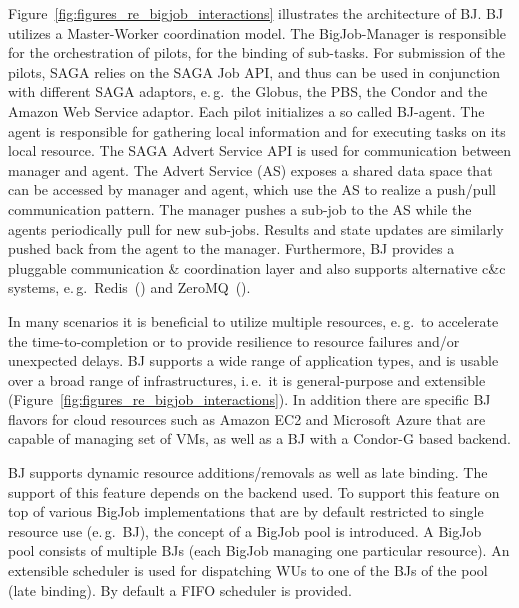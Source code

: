 \documentclass{sig-alternate}
\begin{document}
Figure~\ref{fig:figures_re_bigjob_interactions} illustrates the
architecture of BJ. BJ utilizes a Master-Worker coordination
model. The BigJob-Manager is responsible for the orchestration of
pilots, for the binding of sub-tasks. For submission of the pilots,
SAGA relies on the SAGA Job API, and thus can be used in conjunction
with different SAGA adaptors, e.\,g.\ the Globus, the PBS, the Condor
and the Amazon Web Service adaptor. Each pilot initializes a so called
BJ-agent. The agent is responsible for gathering local information and
for executing tasks on its local resource. The SAGA Advert Service API
is used for communication between manager and agent. The Advert
Service (AS) exposes a shared data space that can be accessed by
manager and agent, which use the AS to realize a push/pull
communication pattern.  The manager pushes a sub-job to the AS while
the agents periodically pull for new sub-jobs. Results and state
updates are similarly pushed back from the agent to the
manager. Furthermore, BJ provides a pluggable communication \&
coordination layer and also supports alternative c\&c systems,
e.\,g.\ Redis~(\cite{redis}) and ZeroMQ~(\cite{zmq}).

In many scenarios it is beneficial to utilize multiple resources,
e.\,g.\ to accelerate the time-to-completion or to provide resilience
to resource failures and/or unexpected delays.  BJ supports a wide
range of application types, and is usable over a broad range of
infrastructures, i.\,e.\ it is general-purpose and extensible
(Figure~\ref{fig:figures_re_bigjob_interactions}). In addition there
are specific BJ flavors for cloud resources such as Amazon EC2 and
Microsoft Azure that are capable of managing set of VMs, as well as a
BJ with a Condor-G based backend.

BJ supports dynamic resource additions/removals as well as late
binding. The support of this feature depends on the backend used. To
support this feature on top of various BigJob implementations that are
by default restricted to single resource use (e.\,g.\ BJ), the concept
of a BigJob pool is introduced. A BigJob pool consists of multiple BJs
(each BigJob managing one particular resource). An extensible
scheduler is used for dispatching WUs to one of the BJs of the pool
(late binding). By default a FIFO scheduler is provided.
\end{document}
